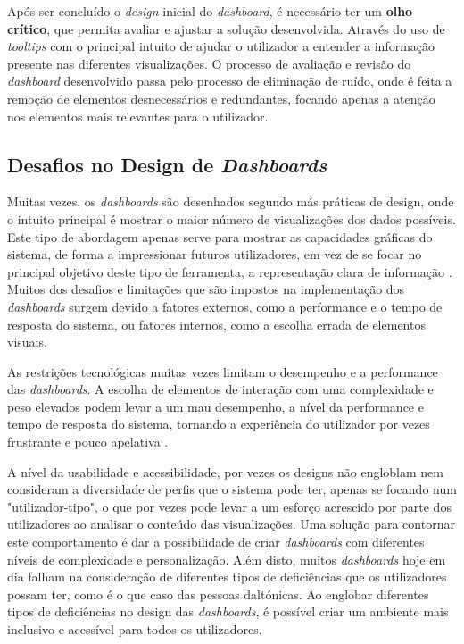 Após ser concluído o \textit{design} inicial do \textit{dashboard}, é necessário ter um \textbf{olho crítico}, que permita avaliar e ajustar a solução desenvolvida. Através do uso de \textit{tooltips} com o principal intuito de ajudar o utilizador a entender a informação presente nas diferentes visualizações. O processo de avaliação e revisão do \textit{dashboard} desenvolvido passa pelo processo de eliminação de ruído, onde é feita a remoção de elementos desnecessários e redundantes, focando apenas a atenção nos elementos mais relevantes para o utilizador. 

\subsection{Desafios no Design de \textit{Dashboards}}
\label{sub:desafios_design}

Muitas vezes, os \textit{dashboards} são desenhados segundo más práticas de design, onde o intuito principal é mostrar o maior número de visualizações dos dados possíveis. Este tipo de abordagem apenas serve para mostrar as capacidades gráficas do sistema, de forma a impressionar futuros utilizadores, em vez de se focar no principal objetivo deste tipo de ferramenta, a representação clara de informação \cite{janes2013effective}. Muitos dos desafios e limitações que são impostos na implementação dos \textit{dashboards} surgem devido a fatores externos, como a performance e o tempo de resposta do sistema, ou fatores internos, como a escolha errada de elementos visuais. 

As restrições tecnológicas muitas vezes limitam o desempenho e a performance das \textit{dashboards}. A escolha de elementos de interação com uma complexidade e peso elevados podem levar a um mau desempenho, a nível da performance e tempo de resposta do sistema, tornando a experiência do utilizador por vezes frustrante e pouco apelativa \cite{eckerson2010performance}. 

A nível da usabilidade e acessibilidade, por vezes os designs não engloblam nem consideram a diversidade de perfis que o sistema pode ter, apenas se focando num "utilizador-tipo", o que por vezes pode levar a um esforço acrescido por parte dos utilizadores ao analisar o conteúdo das visualizações. Uma solução para contornar este comportamento é dar a possibilidade de criar \textit{dashboards} com diferentes níveis de complexidade e personalização. Além disto, muitos \textit{dashboards} hoje em dia falham na consideração de diferentes tipos de deficiências que os utilizadores possam ter, como é o que caso das pessoas daltónicas. Ao englobar diferentes tipos de deficiências no design das \textit{dashboards}, é possível criar um ambiente mais inclusivo e acessível para todos os utilizadores.

